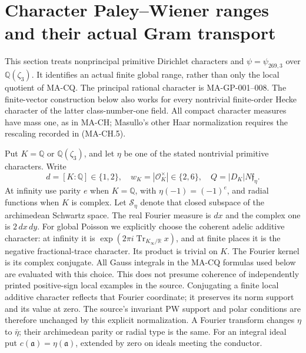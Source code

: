 \section{Character Paley--Wiener ranges and their actual Gram transport}
\label{sec:character-global-pw}

This section treats nonprincipal primitive Dirichlet characters and
$\psi=\psi_{269,3}$ over $\mathbb Q(\zeta_3)$.  It identifies an
actual finite global range, rather than only the local quotient of
MA-CQ.  The principal rational character is MA-GP-001--008.
The finite-vector construction below also works for every nontrivial
finite-order Hecke character of the latter class-number-one field.
All compact character measures have mass one, as in MA-CH;
Masullo's other Haar normalization requires the rescaling recorded
in (MA-CH.5).

Put $K=\mathbb Q$ or $\mathbb Q(\zeta_3)$, and let $\eta$ be
one of the stated nontrivial primitive characters.  Write
\[
 d=[K:\mathbb Q]\in\{1,2\},\quad
 w_K=|\mathcal O_K^\times|\in\{2,6\},\quad
 Q=|D_K|N\mathfrak f_\eta.
 \tag{MA-CGP.1}
\]
At infinity use parity $e$ when $K=\mathbb Q$, with
$\eta(-1)=(-1)^e$, and radial functions when $K$ is complex.
Let $\mathscr S_\eta$ denote that closed subspace of the
archimedean Schwartz space.  The real Fourier measure is $dx$
and the complex one is $2\,dx\,dy$.  For global Poisson we
explicitly choose the coherent adelic additive character:
at infinity it is $\exp(2\pi i\operatorname{Tr}_{K_\infty/\mathbb R}x)$,
and at finite places it is the negative fractional-trace
character.  Its product is trivial on $K$.  The Fourier
kernel is its complex conjugate.  All Gauss integrals in
the MA-CQ formulas used below are evaluated with this choice.
This does not presume coherence of independently printed
positive-sign local examples in the source.  Conjugating a
finite local additive character reflects that Fourier
coordinate; it preserves its norm support and its value at
zero.  The source's invariant PW support and polar conditions
are therefore unchanged by this explicit normalization.
A Fourier transform changes $\eta$ to
$\bar\eta$; their archimedean parity or radial type is the same.
For an integral ideal put $c(\mathfrak a)=\eta(\mathfrak a)$,
extended by zero on ideals meeting the conductor.

